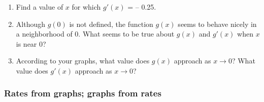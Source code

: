 \begin{enumerate}
\begin{enumerate}
  \item Find a value of $x$ for which $g'(x)$ = -- 0.25.

  \item Although $g(0)$ is not defined, the function $g(x)$ seems to
behave nicely in a neighborhood of 0.  What seems to be true about
$g(x)$ and $g'(x)$ when $x$ is near 0?

  \item According to your graphs, what value does $g(x)$ approach as $x
\to 0$?  What value does $g'(x)$ approach as $x \to 0$?



\end{enumerate}
\end{enumerate}
\subsubsection{Rates from graphs; graphs from rates}
\label{subsubsec:rates-from-graphs-graphs-from-rates}




